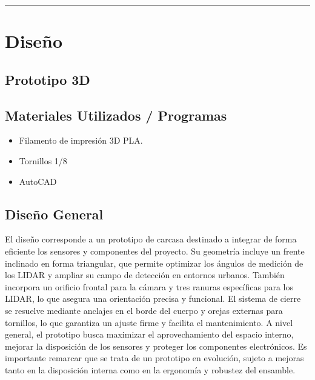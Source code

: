\documentclass[12pt,a4paper]{article}
\newcommand{\separador}{\vspace{0.5cm}\noindent\rule{\linewidth}{0.5pt}\vspace{0.5cm}}
\begin{document}
\separador

\section{Diseño}

\subsection*{ Prototipo 3D}

\subsection*{ Materiales Utilizados / Programas}
\begin{itemize}
\item Filamento de impresión 3D PLA.
\item Tornillos 1/8
\item AutoCAD
\end{itemize}

\subsection{Diseño General}
El diseño corresponde a un prototipo de carcasa destinado a integrar de forma eficiente los sensores y componentes del proyecto. Su geometría incluye un frente inclinado en forma triangular, que permite optimizar los ángulos de medición de los LIDAR y ampliar su campo de detección en entornos urbanos. También incorpora un orificio frontal para la cámara y tres ranuras específicas para los LIDAR, lo que asegura una orientación precisa y funcional. El sistema de cierre se resuelve mediante anclajes en el borde del cuerpo y orejas externas para tornillos, lo que garantiza un ajuste firme y facilita el mantenimiento. A nivel general, el prototipo busca maximizar el aprovechamiento del espacio interno, mejorar la disposición de los sensores y proteger los componentes electrónicos. Es importante remarcar que se trata de un prototipo en evolución, sujeto a mejoras tanto en la disposición interna como en la ergonomía y robustez del ensamble.
\end{document}
